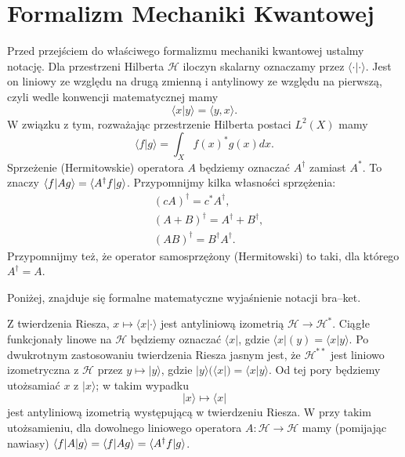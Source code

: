 \section{Formalizm Mechaniki Kwantowej}
Przed przejściem do właściwego formalizmu mechaniki kwantowej
ustalmy notację. Dla przestrzeni Hilberta $\mathcal H$ iloczyn skalarny
oznaczamy przez $\langle \cdot | \cdot \rangle$. Jest on liniowy ze względu
na drugą zmienną i antylinowy ze względu na pierwszą, czyli wedle konwencji
matematycznej mamy
\begin{equation*}
    \langle x | y \rangle = \langle y, x \rangle.
\end{equation*}
W związku z tym, rozważając przestrzenie Hilberta postaci $L^2(X)$ mamy
\begin{equation*}
    \langle f | g \rangle = \int_X f(x)^* g(x) dx.
\end{equation*}
Sprzeżenie (Hermitowskie) operatora $A$ będziemy oznaczać $A^\dagger$
zamiast $A^*$. To znaczy $\braket{f|Ag} = \braket{A^\dagger f| g}$.
Przypomnijmy kilka własności sprzężenia:
\begin{equation*}
	\begin{split}
		&(cA)^{\dagger} = c^* A^{\dagger}, \\
		&(A + B)^{\dagger} = A^{\dagger} + B^{\dagger},\\
		&(AB)^{\dagger} = B^{\dagger}A^{\dagger}.
	\end{split}
\end{equation*}
Przypomnijmy też, że operator samosprzężony (Hermitowski) to taki, dla którego $A^\dagger = A$.

Poniżej, znajduje się formalne matematyczne wyjaśnienie notacji bra--ket.

Z twierdzenia Riesza, $x \mapsto \langle x | \cdot \rangle$ jest antyliniową
izometrią $\mathcal H \to \mathcal H^*$.
Ciągłe funkcjonały linowe na $\mathcal H$ będziemy oznaczać $\langle x|$,
gdzie $\langle x| (y) = \langle x | y \rangle$.
Po dwukrotnym zastosowaniu twierdzenia Riesza jasnym jest, że $\mathcal H^{**}$
jest liniowo izometryczna z $\mathcal H$ przez $y \mapsto | y \rangle$, gdzie
$|y\rangle (\langle x |) = \langle x | y \rangle$.
Od tej pory będziemy utożsamiać $x$ z $|x\rangle$; w takim wypadku
\begin{equation*}
    |x \rangle \mapsto \langle x |
\end{equation*}
jest antyliniową izometrią występującą w twierdzeniu Riesza.
W przy takim utożsamieniu, dla dowolnego liniowego operatora
$A \colon \mathcal H \to \mathcal H$ mamy (pomijając nawiasy)
$\braket{f|A|g} = \braket{f|Ag} = \braket{A^\dagger f | g}$.

